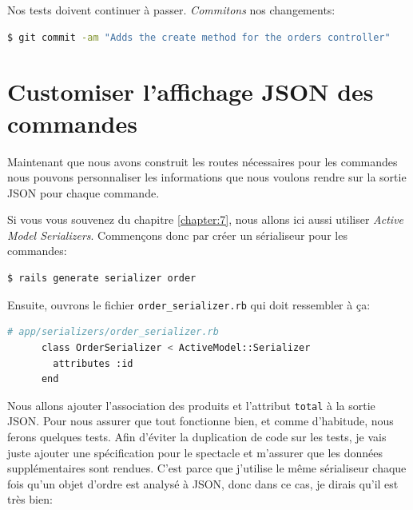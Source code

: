 \documentclass[]{report}
\begin{document}
      Nos tests doivent continuer à passer. \textit{Commitons} nos changements:

      \begin{scriptsize}
        \begin{lstlisting}[language=bash]
        $ git commit -am "Adds the create method for the orders controller"
        \end{lstlisting}
      \end{scriptsize}

  \section{Customiser l'affichage JSON des commandes}

    Maintenant que nous avons construit les routes nécessaires pour les commandes nous pouvons personnaliser les informations que nous voulons rendre sur la sortie JSON pour chaque commande.

    Si vous vous souvenez du chapitre \ref{chapter:7}, nous allons ici aussi utiliser \textit{Active Model Serializers}. Commençons donc par créer un sérialiseur pour les commandes:

    \begin{scriptsize}
      \begin{lstlisting}[language=bash]
      $ rails generate serializer order
      \end{lstlisting}
    \end{scriptsize}

    Ensuite, ouvrons le fichier \verb|order_serializer.rb| qui doit ressembler à ça:

    \begin{scriptsize}
      \begin{lstlisting}[language=bash]
      # app/serializers/order_serializer.rb
      class OrderSerializer < ActiveModel::Serializer
        attributes :id
      end
      \end{lstlisting}
    \end{scriptsize}


    Nous allons ajouter l'association des produits et l'attribut \verb|total| à la sortie JSON. Pour nous assurer que tout fonctionne bien, et comme d'habitude, nous ferons quelques tests. Afin d'éviter la duplication de code sur les tests, je vais juste ajouter une spécification pour le spectacle et m'assurer que les données supplémentaires sont rendues. C'est parce que j'utilise le même sérialiseur chaque fois qu'un objet d'ordre est analysé à JSON, donc dans ce cas, je dirais qu'il est très bien:
\end{document}
